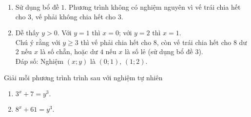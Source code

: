 \begin{bt}
{\begin{enumerate}
Nếu $x$ chẵn, đặt $x=2n$ $(n \in \mathbb{N})$, đưa về $(y+5^x)(y-5^x)=51$. \\
Xét các ước của $51$, ta tìm được $5^n =25 \Leftrightarrow n=2$. \\
Khi đó $x=4$ và $5^4+51=26^2$.
\item Sử dụng bổ đề $1$. Phương trình không có nghiệm nguyên vì vế trái chia hết cho $3$, vế phải không chia hết cho $3$. 
\item Dễ thấy $y>0$. Với $y=1$ thì $x=0$; với $y=2$ thì $x=1$. \\
Chú ý rằng với $y \geq 3$ thì vế phải chia hết cho $8$, còn vế trái chia hết cho $8$ dư $2$ nếu $x$ là số chẵn, hoặc dư $4$ nếu $x$ là số lẻ (sử dụng bổ đề $3$). \\
Đáp số: Nghiệm $(x;y)$ là $(0;1)$, $(1;2)$. 
\end{enumerate}
}
\end{bt}

\begin{bt}
Giải mỗi phương trình trình sau với nghiệm tự nhiên
\begin{multicols}{2}
\begin{enumerate}
\item $3^x+7=y^3.$ 
\item $8^x+61=y^3.$
\end{enumerate}
\end{multicols}
\end{bt}

